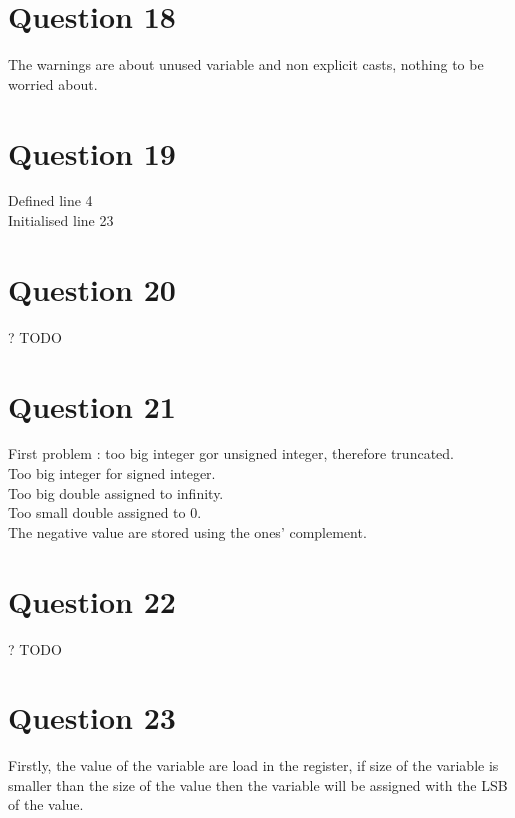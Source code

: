 \documentclass[a4paper,10pt]{article}
\begin{document}
\section*{Question 18}
The warnings are about unused variable and non explicit casts, nothing to be worried about.

\section*{Question 19}
Defined line 4\\
Initialised line 23

\section*{Question 20}
? TODO

\section*{Question 21}
First problem : too big integer gor unsigned integer, therefore truncated.\\
Too big integer for signed integer.\\
Too big double assigned to infinity.\\
Too small double assigned to 0.\\
The negative value are stored using the ones' complement.

\section*{Question 22}
? TODO

\section*{Question 23}
Firstly, the value of the variable are load in the register, if size of the variable is smaller than the size of the value then the variable will be assigned with the LSB of the value.\\
\end{document}
